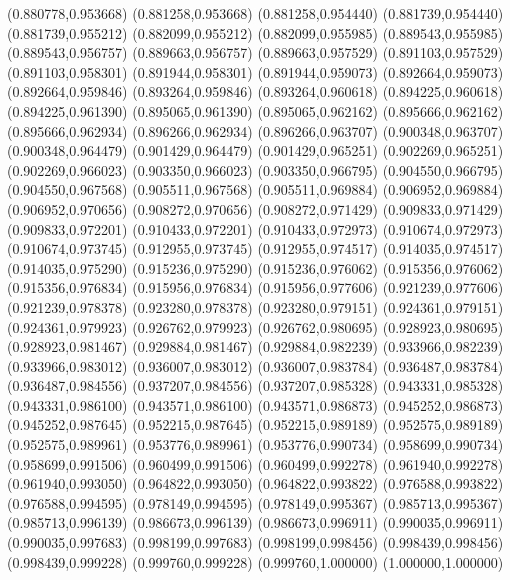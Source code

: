 (0.880778,0.953668)
(0.881258,0.953668)
(0.881258,0.954440)
(0.881739,0.954440)
(0.881739,0.955212)
(0.882099,0.955212)
(0.882099,0.955985)
(0.889543,0.955985)
(0.889543,0.956757)
(0.889663,0.956757)
(0.889663,0.957529)
(0.891103,0.957529)
(0.891103,0.958301)
(0.891944,0.958301)
(0.891944,0.959073)
(0.892664,0.959073)
(0.892664,0.959846)
(0.893264,0.959846)
(0.893264,0.960618)
(0.894225,0.960618)
(0.894225,0.961390)
(0.895065,0.961390)
(0.895065,0.962162)
(0.895666,0.962162)
(0.895666,0.962934)
(0.896266,0.962934)
(0.896266,0.963707)
(0.900348,0.963707)
(0.900348,0.964479)
(0.901429,0.964479)
(0.901429,0.965251)
(0.902269,0.965251)
(0.902269,0.966023)
(0.903350,0.966023)
(0.903350,0.966795)
(0.904550,0.966795)
(0.904550,0.967568)
(0.905511,0.967568)
(0.905511,0.969884)
(0.906952,0.969884)
(0.906952,0.970656)
(0.908272,0.970656)
(0.908272,0.971429)
(0.909833,0.971429)
(0.909833,0.972201)
(0.910433,0.972201)
(0.910433,0.972973)
(0.910674,0.972973)
(0.910674,0.973745)
(0.912955,0.973745)
(0.912955,0.974517)
(0.914035,0.974517)
(0.914035,0.975290)
(0.915236,0.975290)
(0.915236,0.976062)
(0.915356,0.976062)
(0.915356,0.976834)
(0.915956,0.976834)
(0.915956,0.977606)
(0.921239,0.977606)
(0.921239,0.978378)
(0.923280,0.978378)
(0.923280,0.979151)
(0.924361,0.979151)
(0.924361,0.979923)
(0.926762,0.979923)
(0.926762,0.980695)
(0.928923,0.980695)
(0.928923,0.981467)
(0.929884,0.981467)
(0.929884,0.982239)
(0.933966,0.982239)
(0.933966,0.983012)
(0.936007,0.983012)
(0.936007,0.983784)
(0.936487,0.983784)
(0.936487,0.984556)
(0.937207,0.984556)
(0.937207,0.985328)
(0.943331,0.985328)
(0.943331,0.986100)
(0.943571,0.986100)
(0.943571,0.986873)
(0.945252,0.986873)
(0.945252,0.987645)
(0.952215,0.987645)
(0.952215,0.989189)
(0.952575,0.989189)
(0.952575,0.989961)
(0.953776,0.989961)
(0.953776,0.990734)
(0.958699,0.990734)
(0.958699,0.991506)
(0.960499,0.991506)
(0.960499,0.992278)
(0.961940,0.992278)
(0.961940,0.993050)
(0.964822,0.993050)
(0.964822,0.993822)
(0.976588,0.993822)
(0.976588,0.994595)
(0.978149,0.994595)
(0.978149,0.995367)
(0.985713,0.995367)
(0.985713,0.996139)
(0.986673,0.996139)
(0.986673,0.996911)
(0.990035,0.996911)
(0.990035,0.997683)
(0.998199,0.997683)
(0.998199,0.998456)
(0.998439,0.998456)
(0.998439,0.999228)
(0.999760,0.999228)
(0.999760,1.000000)
(1.000000,1.000000)